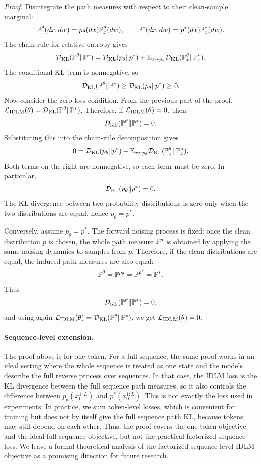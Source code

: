 \begin{proof}
Disintegrate the path measures with respect to their clean-sample marginal:
\[
    \mathbb{P}^\theta(dx,dw)=p_\theta(dx)\mathbb{P}_x^\theta(dw),
    \qquad
    \mathbb{P}^*(dx,dw)=p^*(dx)\mathbb{P}_x^*(dw).
\]
The chain rule for relative entropy gives
\[
    \mathcal{D}_{\mathrm{KL}}(\mathbb{P}^\theta\|\mathbb{P}^*)
    =
    \mathcal{D}_{\mathrm{KL}}(p_\theta\|p^*)
    +
    \mathbb{E}_{x\sim p_\theta}
    \mathcal{D}_{\mathrm{KL}}(\mathbb{P}_x^\theta\|\mathbb{P}_x^*).
\]
The conditional KL term is nonnegative, so
\[
    \mathcal{D}_{\mathrm{KL}}(\mathbb{P}^\theta\|\mathbb{P}^*)
    \geq
    \mathcal{D}_{\mathrm{KL}}(p_\theta\|p^*)
    \geq 0.
\]
Now consider the zero-loss condition. From the previous part of the proof,
\(\mathcal{L}_{\mathrm{IDLM}}(\theta)=\mathcal{D}_{\mathrm{KL}}(\mathbb{P}^\theta\|\mathbb{P}^*)\). Therefore,
if \(\mathcal{L}_{\mathrm{IDLM}}(\theta)=0\), then
\[
    \mathcal{D}_{\mathrm{KL}}(\mathbb{P}^\theta\|\mathbb{P}^*)=0.
\]
Substituting this into the chain-rule decomposition gives
\[
    0
    =
    \mathcal{D}_{\mathrm{KL}}(p_\theta\|p^*)
    +
    \mathbb{E}_{x\sim p_\theta}
    \mathcal{D}_{\mathrm{KL}}(\mathbb{P}_x^\theta\|\mathbb{P}_x^*).
\]
Both terms on the right are nonnegative, so each term must be zero. In
particular,
\[
    \mathcal{D}_{\mathrm{KL}}(p_\theta\|p^*)=0.
\]
The KL divergence between two probability distributions is zero only when the
two distributions are equal, hence \(p_\theta=p^*\).

Conversely, assume \(p_\theta=p^*\). The forward noising process is fixed: once
the clean distribution \(p\) is chosen, the whole path measure \(\mathbb{P}^p\) is
obtained by applying the same noising dynamics to samples from \(p\). Therefore,
if the clean distributions are equal, the induced path measures are also equal:
\[
    \mathbb{P}^\theta=\mathbb{P}^{p_\theta}=\mathbb{P}^{p^*}=\mathbb{P}^*.
\]
Thus
\[
    \mathcal{D}_{\mathrm{KL}}(\mathbb{P}^\theta\|\mathbb{P}^*)=0,
\]
and using again
\(\mathcal{L}_{\mathrm{IDLM}}(\theta)=\mathcal{D}_{\mathrm{KL}}(\mathbb{P}^\theta\|\mathbb{P}^*)\), we get
\(\mathcal{L}_{\mathrm{IDLM}}(\theta)=0\).
\end{proof}

\paragraph{Sequence-level extension.}
\label{app:sequence-level-extension}
The proof above is for one token. For a full sequence, the same proof works in
an ideal setting where the whole sequence is treated as one state and the models
describe the full reverse process over sequences. In that case, the IDLM loss is
the KL divergence between the full sequence path measures, so it also controls
the difference between \(p_\theta(x_0^{1:L})\) and \(p^*(x_0^{1:L})\). This is
not exactly the loss used in experiments. In practice, we sum token-level losses,
which is convenient for training but does not by itself give the full sequence
path KL, because tokens may still depend on each other. Thus, the proof covers
the one-token objective and the ideal full-sequence objective, but not the
practical factorized sequence loss. We leave a formal theoretical analysis of
the factorized sequence-level IDLM objective as a promising direction for future
research.

